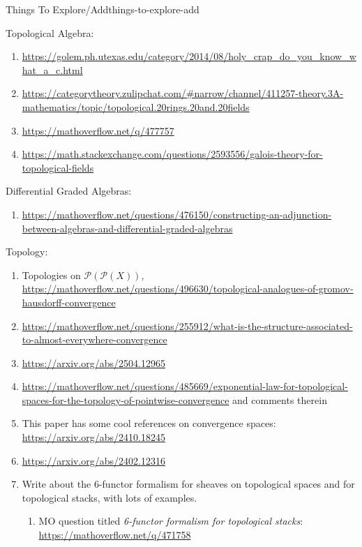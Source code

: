 \begin{remark}{Things To Explore/Add}{things-to-explore-add}
\begin{enumerate}
    \end{enumerate}
    Topological Algebra:
    \begin{enumerate}
        \item \url{https://golem.ph.utexas.edu/category/2014/08/holy\_crap\_do\_you\_know\_what\_a\_c.html}
        \item \url{https://categorytheory.zulipchat.com/#narrow/channel/411257-theory.3A-mathematics/topic/topological.20rings.20and.20fields}
        \item \url{https://mathoverflow.net/q/477757}
        \item \url{https://math.stackexchange.com/questions/2593556/galois-theory-for-topological-fields}
    \end{enumerate}
    Differential Graded Algebras:
    \begin{enumerate}
        \item \url{https://mathoverflow.net/questions/476150/constructing-an-adjunction-between-algebras-and-differential-graded-algebras}
    \end{enumerate}
    Topology:
    \begin{enumerate}
        \item Topologies on $\mathcal{P}(\mathcal{P}(X))$, \url{https://mathoverflow.net/questions/496630/topological-analogues-of-gromov-hausdorff-convergence}
        \item \url{https://mathoverflow.net/questions/255912/what-is-the-structure-associated-to-almost-everywhere-convergence}
        \item \url{https://arxiv.org/abs/2504.12965}
        \item \url{https://mathoverflow.net/questions/485669/exponential-law-for-topological-spaces-for-the-topology-of-pointwise-convergence} and comments therein
        \item This paper has some cool references on convergence spaces: \url{https://arxiv.org/abs/2410.18245}
        \item \url{https://arxiv.org/abs/2402.12316}
        \item Write about the 6-functor formalism for sheaves on topological spaces and for topological stacks, with lots of examples.
            \begin{enumerate}
                \item MO question titled \emph{6-functor formalism for topological stacks}: \url{https://mathoverflow.net/q/471758}
            \end{enumerate}
    \end{enumerate}

\end{remark}
